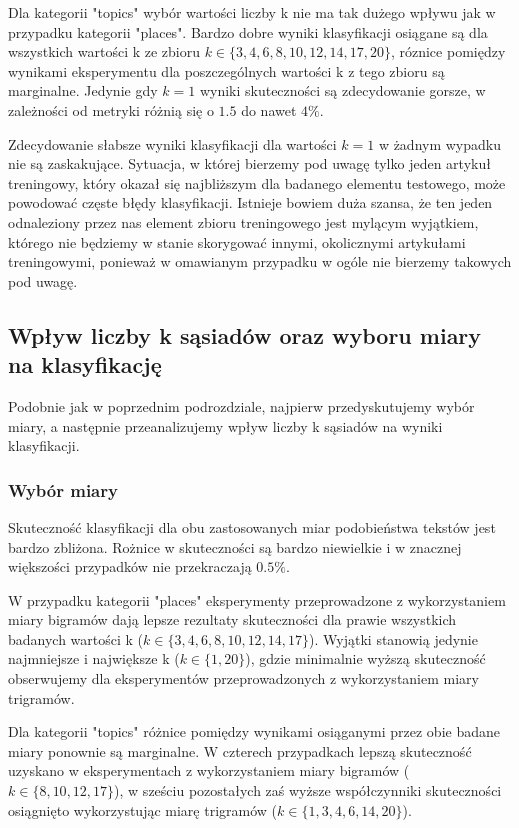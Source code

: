 \documentclass{classrep}
\begin{document}
Dla kategorii "topics" wybór wartości liczby k nie ma tak dużego wpływu jak w przypadku kategorii "places". Bardzo dobre wyniki klasyfikacji osiągane są dla wszystkich wartości k ze zbioru $k \in \{3, 4, 6, 8, 10, 12, 14, 17, 20\}$, róznice pomiędzy wynikami eksperymentu dla poszczególnych wartości k z tego zbioru są marginalne. Jedynie gdy $k=1$ wyniki skuteczności są zdecydowanie gorsze, w zależności od metryki różnią się o $1.5$ do nawet $4\%$. \newline

Zdecydowanie słabsze wyniki klasyfikacji dla wartości $k=1$ w żadnym wypadku nie są zaskakujące. Sytuacja, w której bierzemy pod uwagę tylko jeden artykuł treningowy, który okazał się najbliższym dla badanego elementu testowego, może powodować częste błędy klasyfikacji. Istnieje bowiem duża szansa, że ten jeden odnaleziony przez nas element zbioru treningowego jest mylącym wyjątkiem, którego nie będziemy w stanie skorygować innymi, okolicznymi artykułami treningowymi, ponieważ w omawianym przypadku w ogóle nie bierzemy takowych pod uwagę.

\subsection{Wpływ liczby k sąsiadów oraz wyboru miary na klasyfikację}
Podobnie jak w poprzednim podrozdziale, najpierw przedyskutujemy wybór miary, a następnie przeanalizujemy wpływ liczby k sąsiadów na wyniki klasyfikacji.

\subsubsection{Wybór miary}
Skuteczność klasyfikacji dla obu zastosowanych miar podobieństwa tekstów jest bardzo zbliżona. Rożnice w skuteczności są bardzo niewielkie i w znacznej większości przypadków nie przekraczają $0.5\%$.\newline

W przypadku kategorii "places" eksperymenty przeprowadzone z wykorzystaniem miary bigramów dają lepsze rezultaty skuteczności dla prawie wszystkich badanych wartości k ($k \in \{3, 4, 6, 8, 10, 12, 14, 17\}$). Wyjątki stanowią jedynie najmniejsze i największe k ($k \in \{1, 20\}$), gdzie minimalnie wyższą skuteczność obserwujemy dla eksperymentów przeprowadzonych z wykorzystaniem miary trigramów. \newline

Dla kategorii "topics" różnice pomiędzy wynikami osiąganymi przez obie badane miary ponownie są marginalne. W czterech przypadkach lepszą skuteczność uzyskano w eksperymentach z wykorzystaniem miary bigramów ($k \in \{8, 10, 12, 17\}$), w sześciu pozostałych zaś wyższe współczynniki skuteczności osiągnięto wykorzystując miarę trigramów ($k \in \{1, 3, 4, 6, 14, 20\}$). \newline
\end{document}
